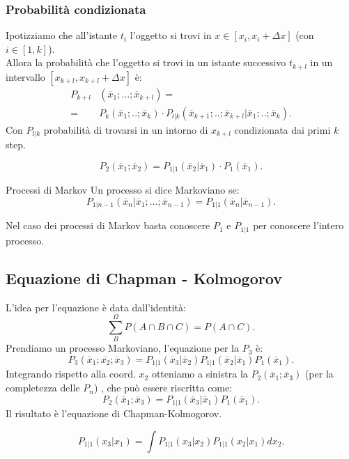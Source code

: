 \subsubsection{Probabilità condizionata}%
\label{subsub:Probabilità condizionata}
Ipotizziamo che all'istante $t_i$ l'oggetto si trovi in $x \in \left[x_i, x_i + \Delta x\right]$ (con $i \in \left[1, k\right]$).\\
Allora la probabilità che l'oggetto si trovi in un istante successivo $t_{k+l}$ in un intervallo $\left[x_{k+l}, x_{k+l} + \Delta x\right]$ è:
\[\begin{aligned}
    P_{k+l}&(\overline{x}_1;\ldots; \overline{x}_{k+l}) =\\
    =&P_k(\overline{x}_1;..;\overline{x}_k)\cdot P_{l|k}(\overline{x}_{k+1};..;\overline{x}_{k+l}|\overline{x}_1;..;\overline{x}_k) 
.\end{aligned}\]
Con $P_{l|k}$ probabilità di trovarsi in un intorno di $x_{k+l}$ condizionata dai primi $k$ step. 
\begin{exmp}
    \[
	P_2(\overline{x}_1;\overline{x}_2) = P_{1|1}(\overline{x}_2|\overline{x}_1) \cdot P_1(\overline{x}_1) 
    .\] 
\end{exmp}
\noindent

\begin{greenbox}{Processi di Markov}
    Un processo si dice Markoviano se:
    \[
	P_{1|n-1}(\overline{x}_n|\overline{x}_1;\ldots;\overline{x}_{n-1})  = P_{1|1}(\overline{x}_n|\overline{x}_{n-1}) 
    .\] 
\end{greenbox}
\noindent
Nel caso dei processi di Markov basta conoscere $P_1$ e $P_{1|1}$ per conoscere l'intero processo.


\subsection{Equazione di Chapman - Kolmogorov}%
\label{sub:Equazione di Chapman-Kolmogorov}

L'idea per l'equazione è data dall'identità:
\[
    \sum_{B}^{\Omega} P(A \cap B \cap C) = P(A \cap C) 
.\] 
Prendiamo un processo Markoviano, l'equazione per la $P_3$ è:
\[
    P_3(\overline{x}_1; \overline{x_2}; \overline{x}_3) = P_{1|1}(\overline{x}_3| \overline{x}_2) P_{1|1}(\overline{x}_2 | \overline{x}_1) 
    P_1(\overline{x}_1) 
.\] 
Integrando rispetto alla coord. $x_2$ otteniamo a sinistra la $P_2(\overline{x}_1;\overline{x}_3)$ (per la completezza delle $P_n$) , che può essere riscritta come:
\[
    P_2(\overline{x}_1;\overline{x}_3) = P_{1|1}(\overline{x}_3|\overline{x}_1) P_1(\overline{x}_1)
.\] 
Il risultato è l'equazione di Chapman-Kolmogorov.
\begin{redbox}{}
    \[
	P_{1|1}(x_3|x_1) = \int P_{1|1}(x_3|x_2) P_{1|1}(x_2|x_1)dx_2
    .\] 
\end{redbox}
\noindent
\clearpage
